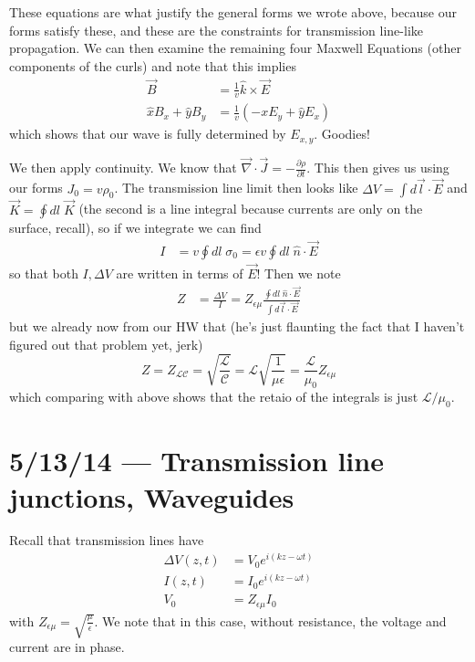 \documentclass[10pt]{report}
\newcommand{\pd}[2]{\frac{\partial #1}{\partial#2}}
\begin{document}
These equations are what justify the general forms we wrote above, because our forms satisfy these, and these are the constraints for transmission line-like propagation. We can then examine the remaining four Maxwell Equations (other components of the curls) and note that this implies
\begin{align}
    \vec{B} &= \frac{1}{v}\hat{k}\times \vec{E}\\
    \hat{x}B_x + \hat{y}B_y &= \frac{1}{v}\left( -x E_y + \hat{y}E_x \right)
\end{align}
which shows that our wave is fully determined by $E_{x,y}$. Goodies!

We then apply continuity. We know that $\vec{\nabla} \cdot \vec{J} = -\pd{\rho}{t}$. This then gives us using our forms $J_0 = v\rho_0$. The transmission line limit then looks like $\Delta V = \int d\vec{l} \cdot \vec{E}$ and $\vec{K} = \oint dl\; \vec{K}$ (the second is a line integral because currents are only on the surface, recall), so if we integrate we can find
\begin{align}
    I &= v \oint dl\; \sigma_0 = \epsilon v \oint dl \;\hat{n} \cdot \vec{E}
\end{align}
so that both $I,\Delta V$ are written in terms of $\vec{E}$! Then we note
\begin{align}
    Z &= \frac{\Delta V}{I} = Z_{\epsilon \mu}\frac{\oint dl\; \hat{n} \cdot \vec{E}}{\int d\vec{l} \cdot \vec{E}}
\end{align}
but we already now from our HW that (he's just flaunting the fact that I haven't figured out that problem yet, jerk)
\begin{equation}
    Z = Z_{\mathcal{LC}} = \sqrt{\frac{\mathcal{L}}{\mathcal{C}}} = \mathcal{L}\sqrt{\frac{1}{\mu \epsilon}} = \frac{\mathcal{L}}{\mu_0}Z_{\epsilon \mu}
\end{equation}
which comparing with above shows that the retaio of the integrals is just $\mathcal{L}/\mu_0$.
\chapter{5/13/14 --- Transmission line junctions, Waveguides}

Recall that transmission lines have \begin{align}
    \Delta V(z,t) &= V_0e^{i(kz - \omega t)}\\
    I(z,t) &= I_0e^{i(kz - \omega t)}\\
    V_0 &= Z_{\epsilon\mu} I_0
\end{align}
with $Z_{\epsilon \mu} = \sqrt{\frac{\mu}{\epsilon}}$. We note that in this case, without resistance, the voltage and current are in phase.
\end{document}
